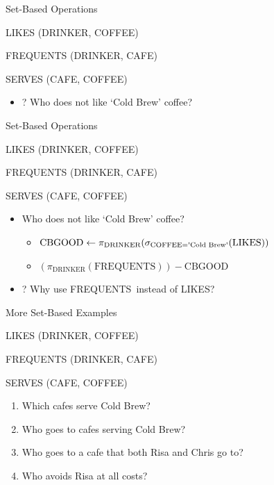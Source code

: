 \documentclass[aspectratio=169]{beamer}
\newenvironment{noindentitemize}
{ \begin{itemize}
 \setlength{\itemsep}{1.5ex}
  \setlength{\parsep}{0pt}   
  \setlength{\parskip}{0pt}
 \addtolength{\leftskip}{-2em}
 }
{ \end{itemize} }
\newenvironment{noindentitemize2}
{ \begin{itemize}
  \setlength{\itemsep}{0ex}
  \setlength{\parskip}{0pt}
  \setlength{\parsep}{0pt}   
  \addtolength{\leftskip}{-2em}  }
{ \end{itemize} }
\newcommand{\LIKES}{\textrm{LIKES}}
\newcommand{\FREQUENTS}{\textrm{FREQUENTS}}
\newcommand{\COFFEE}{\textrm{COFFEE}}
\newcommand{\DRINKER}{\textrm{DRINKER}}
\newcommand{\CB}{\textrm{\textquotesingle{Cold Brew}\textquotesingle}}
\newcommand{\CBGOOD}{\textrm{CBGOOD}}
\begin{document}

\begin{frame}{Set-Based Operations}

LIKES (DRINKER, COFFEE)

FREQUENTS (DRINKER, CAFE)

SERVES (CAFE, COFFEE)

\begin{noindentitemize}
\item[?] Who does not like `Cold Brew' coffee?
\end{noindentitemize}
\end{frame}



\begin{frame}{Set-Based Operations}

LIKES (DRINKER, COFFEE)

FREQUENTS (DRINKER, CAFE)

SERVES (CAFE, COFFEE)

\begin{noindentitemize}
\item Who does not like `Cold Brew' coffee?
	\begin{noindentitemize2}
	\item $\CBGOOD \leftarrow \pi_{\DRINKER} (\sigma_{\COFFEE = \CB}(\LIKES))$
	\item $(\pi_{\DRINKER} (\FREQUENTS)) - \CBGOOD$
	\end{noindentitemize2}
\item[?] Why use \FREQUENTS\ instead of \LIKES?
\end{noindentitemize}
\end{frame}
\begin{frame}{More Set-Based Examples}

LIKES (DRINKER, COFFEE)

FREQUENTS (DRINKER, CAFE)

SERVES (CAFE, COFFEE)
\begin{enumerate}
\item Which cafes serve Cold Brew? 
\item Who goes to cafes serving Cold Brew?
\item Who goes to a cafe that both Risa and Chris go to?
\item Who avoids Risa at all costs?
\end{enumerate}
\end{frame}
\end{document}
